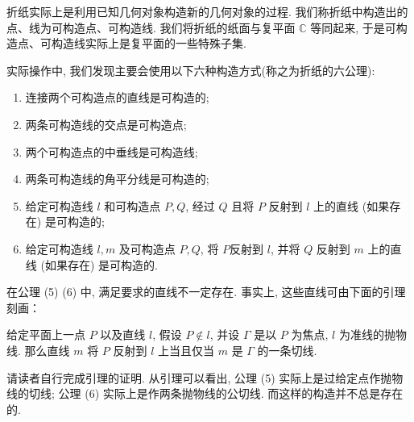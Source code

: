 折纸实际上是利用已知几何对象构造新的几何对象的过程.
 我们称折纸中构造出的点、线为可构造点、可构造线. 
 我们将折纸的纸面与复平面 $\mathbb{C}$ 等同起来, 
 于是可构造点、可构造线实际上是复平面的一些特殊子集. 

实际操作中, 我们发现主要会使用以下六种构造方式(称之为折纸的六公理): 

\begin{enumerate}[wide,itemindent=2em,label=(\arabic*)]
    \item 连接两个可构造点的直线是可构造的; 
    \item 两条可构造线的交点是可构造点; 
    \item 两个可构造点的中垂线是可构造线; 
    \item 两条可构造线的角平分线是可构造的; 
    \item 给定可构造线 $l$ 和可构造点 $P,Q$, 
    经过 $Q$ 且将 $P$ 反射到 $l$ 上的直线 (如果存在) 是可构造的; 
    \item 给定可构造线 $l,m$ 及可构造点 $P,Q$, 
    将 $P$反射到 $l$, 并将 $Q$ 反射到 $m$ 上的直线 (如果存在) 是可构造的. 
\end{enumerate}

在公理 (5) (6) 中, 满足要求的直线不一定存在. 事实上, 这些直线可由下面的引理刻画：

\begin{lemma}
    给定平面上一点 $P$ 以及直线 $l$, 假设 $P \notin l$, 
    并设 $\Gamma$ 是以 $P$ 为焦点, $l$ 为准线的抛物线. 
    那么直线 $m$ 将 $P$ 反射到 $l$ 上当且仅当 $m$ 是 $\Gamma$ 的一条切线. 
\end{lemma}

请读者自行完成引理的证明. 从引理可以看出, 公理 (5) 实际上是过给定点作抛物线的切线; 
公理 (6) 实际上是作两条抛物线的公切线. 而这样的构造并不总是存在的. 